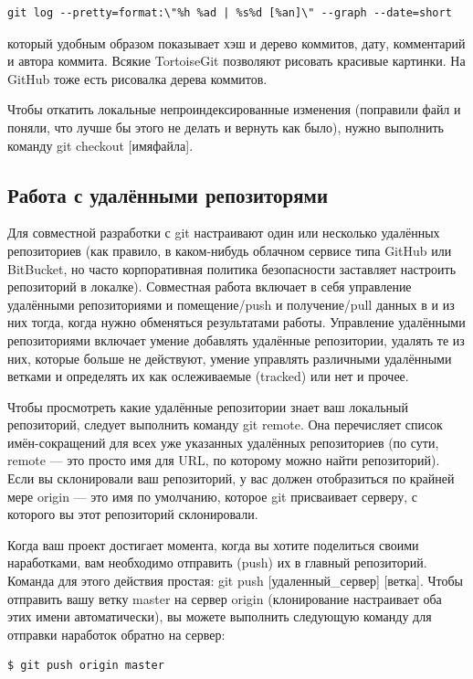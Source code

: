 \documentclass[a5paper]{article}
\begin{document}
\begin{verbatim}
git log --pretty=format:\"%h %ad | %s%d [%an]\" --graph --date=short
\end{verbatim}

который удобным образом показывает хэш и дерево коммитов, дату, комментарий и автора коммита. Всякие TortoiseGit позволяют рисовать красивые картинки. На GitHub тоже есть рисовалка дерева коммитов.

Чтобы откатить локальные непроиндексированные изменения (поправили файл и поняли, что лучше бы этого не делать и вернуть как было), нужно выполнить команду git checkout [имяфайла].

\subsection{Работа с удалёнными репозиторями}

Для совместной разработки с git настраивают один или несколько удалённых репозиториев (как правило, в каком-нибудь облачном сервисе типа GitHub или BitBucket, но часто корпоративная политика безопасности заставляет настроить репозиторий в локалке). Совместная работа включает в себя управление удалёнными репозиториями и помещение/push и получение/pull данных в и из них тогда, когда нужно обменяться результатами работы. Управление удалёнными репозиториями включает умение добавлять удалённые репозитории, удалять те из них, которые больше не действуют, умение управлять различными удалёнными ветками и определять их как ослеживаемые (tracked) или нет и прочее. 

Чтобы просмотреть какие удалённые репозитории знает ваш локальный репозиторий, следует выполнить команду git remote. Она перечисляет список имён-сокращений для всех уже указанных удалённых репозиториев (по сути, remote --- это просто имя для URL, по которому можно найти репозиторий). Если вы склонировали ваш репозиторий, у вас должен отобразиться по крайней мере origin --- это имя по умолчанию, которое git присваивает серверу, с которого вы этот репозиторий склонировали.

Когда ваш проект достигает момента, когда вы хотите поделиться своими наработками, вам необходимо отправить (push) их в главный репозиторий. Команда для этого действия простая: git push [удаленный\_сервер] [ветка]. Чтобы отправить вашу ветку master на сервер origin (клонирование настраивает оба этих имени автоматически), вы можете выполнить следующую команду для отправки наработок обратно на сервер:

\begin{verbatim}
$ git push origin master
\end{verbatim}
\end{document}

